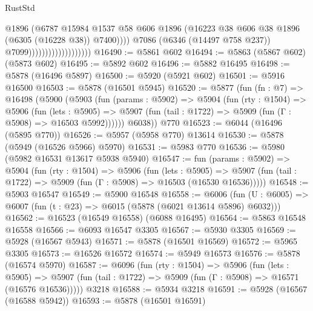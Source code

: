 \begin{lexlean}{RustStd}
\begin{coremodule}
                                              @1896
                                              (@6787
                                                @15984
                                                @1537
                                                @58
                                                @606
                                                @1896
                                                (@16223
                                                  @38
                                                  @606
                                                  @38
                                                  @1896
                                                  (@6305 (@16228 @38))
                                                  @7400))))
                                          @7086
                                          (@6346 (@14497 @758 @237))
                                          @7099)))))))))))))))))))
@16490 := @5861 @602
@16494 := @5863 (@5867 @602) (@5873 @602)
@16495 := @5892 @602
@16496 := @5882 @16495
@16498 := @5878 (@16496 @5897)
@16500 := @5920 (@5921 @602)
@16501 := @5916 @16500
@16503 := @5878 (@16501 @5945)
@16520 := @5877
    (fun (fn : @7) =>
    @16498
      (@5900
        (@5903
          (fun (params : @5902) =>
          @5904
            (fun (rty : @1504) =>
            @5906
              (fun (lets : @5905) =>
              @5907 (fun (tail : @1722) => @5909 (fun (Γ : @5908) => @16503 @5992))))))
        @6038))
    @770
@16523 := @6044 (@16496 (@5895 @770))
@16526 := @5957 (@5958 @770) @13614
@16530 := @5878 (@5949 (@16526 @5966) @5970)
@16531 := @5983 @770
@16536 := @5980 (@5982 @16531 @13617 @5938 @5940)
@16547 := fun (params : @5902) =>
  @5904
    (fun (rty : @1504) =>
    @5906
      (fun (lets : @5905) =>
      @5907 (fun (tail : @1722) => @5909 (fun (Γ : @5908) => @16503 (@16530 @16536)))))
@16548 := @5903 @16547
@16549 := @5900 @16548
@16558 := @6006
    (fun (U : @6005) => @6007 (fun (t : @23) => @6015 (@5878 (@6021 @13614 @5896) @6032)))
@16562 := @16523 (@16549 @16558) (@6088 @16495)
@16564 := @5863 @16548 @16558
@16566 := @6093 @16547 @3305
@16567 := @5930 @3305
@16569 := @5928 (@16567 @5943)
@16571 := @5878 (@16501 @16569)
@16572 := @5965 @3305
@16573 := @16526 @16572
@16574 := @5949 @16573
@16576 := @5878 (@16574 @5970)
@16587 := @6096
    (fun (rty : @1504) =>
    @5906
      (fun (lets : @5905) =>
      @5907 (fun (tail : @1722) => @5909 (fun (Γ : @5908) => @16571 (@16576 @16536)))))
    @3218
@16588 := @5934 @3218
@16591 := @5928 (@16567 (@16588 @5942))
@16593 := @5878 (@16501 @16591)

\end{coremodule}
\end{lexlean}
